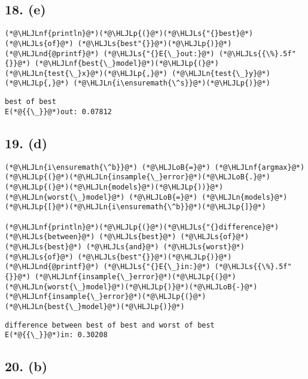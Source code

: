 \documentclass[12pt,a4paper]{article}
\newcommand{\HLJLn}[1]{#1}
\newcommand{\HLJLnd}[1]{\textcolor[RGB]{214,102,97}{#1}}
\newcommand{\HLJLnf}[1]{\textcolor[RGB]{66,102,213}{#1}}
\newcommand{\HLJLs}[1]{\textcolor[RGB]{201,61,57}{#1}}
\newcommand{\HLJLoB}[1]{\textcolor[RGB]{102,102,102}{\textbf{#1}}}
\newcommand{\HLJLp}[1]{#1}
\begin{document}
\subsection{18. (e)}

\begin{lstlisting}
(*@\HLJLnf{println}@*)(*@\HLJLp{(}@*)(*@\HLJLs{"{}best}@*) (*@\HLJLs{of}@*) (*@\HLJLs{best"{}}@*)(*@\HLJLp{)}@*)
(*@\HLJLnd{@printf}@*) (*@\HLJLs{"{}E{\_}out:}@*) (*@\HLJLs{{\%}.5f"{}}@*) (*@\HLJLnf{best{\_}model}@*)(*@\HLJLp{(}@*)(*@\HLJLn{test{\_}x}@*)(*@\HLJLp{,}@*) (*@\HLJLn{test{\_}y}@*)(*@\HLJLp{,}@*) (*@\HLJLn{i\ensuremath{\^s}}@*)(*@\HLJLp{)}@*)
\end{lstlisting}

\begin{lstlisting}
best of best
E(*@{{\_}}@*)out: 0.07812
\end{lstlisting}


\subsection{19. (d)}

\begin{lstlisting}
(*@\HLJLn{i\ensuremath{\^b}}@*) (*@\HLJLoB{=}@*) (*@\HLJLnf{argmax}@*)(*@\HLJLp{(}@*)(*@\HLJLn{insample{\_}error}@*)(*@\HLJLoB{.}@*)(*@\HLJLp{(}@*)(*@\HLJLn{models}@*)(*@\HLJLp{))}@*)
(*@\HLJLn{worst{\_}model}@*) (*@\HLJLoB{=}@*) (*@\HLJLn{models}@*)(*@\HLJLp{[}@*)(*@\HLJLn{i\ensuremath{\^b}}@*)(*@\HLJLp{]}@*)

(*@\HLJLnf{println}@*)(*@\HLJLp{(}@*)(*@\HLJLs{"{}difference}@*) (*@\HLJLs{between}@*) (*@\HLJLs{best}@*) (*@\HLJLs{of}@*) (*@\HLJLs{best}@*) (*@\HLJLs{and}@*) (*@\HLJLs{worst}@*) (*@\HLJLs{of}@*) (*@\HLJLs{best"{}}@*)(*@\HLJLp{)}@*)
(*@\HLJLnd{@printf}@*) (*@\HLJLs{"{}E{\_}in:}@*) (*@\HLJLs{{\%}.5f"{}}@*) (*@\HLJLnf{insample{\_}error}@*)(*@\HLJLp{(}@*)(*@\HLJLn{worst{\_}model}@*)(*@\HLJLp{)}@*)(*@\HLJLoB{-}@*)(*@\HLJLnf{insample{\_}error}@*)(*@\HLJLp{(}@*)(*@\HLJLn{best{\_}model}@*)(*@\HLJLp{)}@*)
\end{lstlisting}

\begin{lstlisting}
difference between best of best and worst of best
E(*@{{\_}}@*)in: 0.30208
\end{lstlisting}


\subsection{20. (b)}
\end{document}
